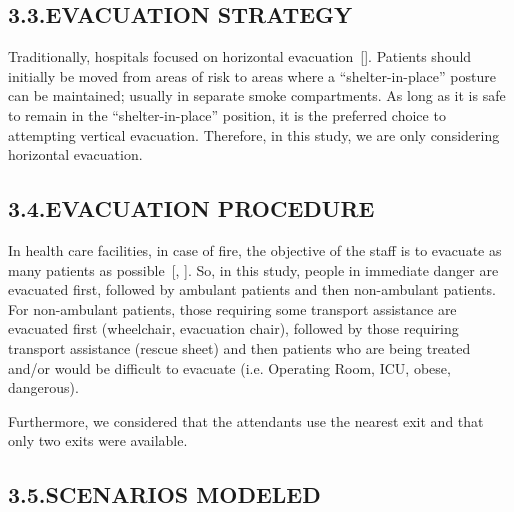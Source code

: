 \documentclass{style/llncs}
\begin{document}
\subsection{3.3.\hspace*{0.5em}EVACUATION STRATEGY}\label{sec-evacuation-strategy}%

\noindent{}Traditionally, hospitals focused on horizontal evacuation~[]. Patients
should initially be moved from areas of risk to areas where a
\textquotedblleft{}shelter-in-place\textquotedblright{} posture can be maintained; usually in
separate smoke compartments. As long as it is safe to remain in the
\textquotedblleft{}shelter-in-place\textquotedblright{} position, it is the preferred choice to
attempting vertical evacuation. Therefore, in this study, we are only
considering horizontal evacuation.%

\subsection{3.4.\hspace*{0.5em}EVACUATION PROCEDURE}\label{sec-evacuation-procedure}%

\noindent{}In health care facilities, in case of fire, the objective of the staff is
to evacuate as many patients as possible~[, ]. So, in this study,
people in immediate danger are evacuated first, followed by ambulant
patients and then non-ambulant patients. For non-ambulant patients, those
requiring some transport assistance are evacuated first (wheelchair,
evacuation chair), followed by those requiring transport assistance
(rescue sheet) and then patients who are being treated and/or would be
difficult to evacuate (i.e. Operating Room, ICU, obese, dangerous).%

Furthermore, we considered that the attendants use the nearest exit and that
only two exits were available.%

\subsection{3.5.\hspace*{0.5em}SCENARIOS MODELED}\label{sec-scenarios-modeled}%
\end{document}
